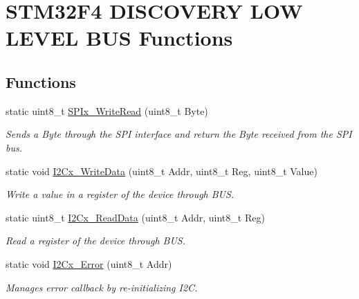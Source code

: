 \hypertarget{group___s_t_m32_f4___d_i_s_c_o_v_e_r_y___l_o_w___l_e_v_e_l___b_u_s___functions}{}\section{S\+T\+M32\+F4 D\+I\+S\+C\+O\+V\+E\+RY L\+OW L\+E\+V\+EL B\+US Functions}
\label{group___s_t_m32_f4___d_i_s_c_o_v_e_r_y___l_o_w___l_e_v_e_l___b_u_s___functions}
\subsection*{Functions}
\begin{DoxyCompactItemize}
\item 
static uint8\+\_\+t \mbox{\hyperlink{group___s_t_m32_f4___d_i_s_c_o_v_e_r_y___l_o_w___l_e_v_e_l___b_u_s___functions_ga76873bcbb97982478f4f834530d5ac36}{S\+P\+Ix\+\_\+\+Write\+Read}} (uint8\+\_\+t Byte)
\begin{DoxyCompactList}\small\item\em Sends a Byte through the S\+PI interface and return the Byte received from the S\+PI bus. \end{DoxyCompactList}\item 
static void \mbox{\hyperlink{group___s_t_m32_f4___d_i_s_c_o_v_e_r_y___l_o_w___l_e_v_e_l___b_u_s___functions_gacc664e812e80f0e38644eda7d36a45cf}{I2\+Cx\+\_\+\+Write\+Data}} (uint8\+\_\+t Addr, uint8\+\_\+t Reg, uint8\+\_\+t Value)
\begin{DoxyCompactList}\small\item\em Write a value in a register of the device through B\+US. \end{DoxyCompactList}\item 
static uint8\+\_\+t \mbox{\hyperlink{group___s_t_m32_f4___d_i_s_c_o_v_e_r_y___l_o_w___l_e_v_e_l___b_u_s___functions_ga83262e4774a2b013627824b62327f03e}{I2\+Cx\+\_\+\+Read\+Data}} (uint8\+\_\+t Addr, uint8\+\_\+t Reg)
\begin{DoxyCompactList}\small\item\em Read a register of the device through B\+US. \end{DoxyCompactList}\item 
static void \mbox{\hyperlink{group___s_t_m32_f4___d_i_s_c_o_v_e_r_y___l_o_w___l_e_v_e_l___b_u_s___functions_ga09e51b18df7371c1397a9a58ef4041eb}{I2\+Cx\+\_\+\+Error}} (uint8\+\_\+t Addr)
\begin{DoxyCompactList}\small\item\em Manages error callback by re-\/initializing I2C. \end{DoxyCompactList}\item 

\end{DoxyCompactItemize}
